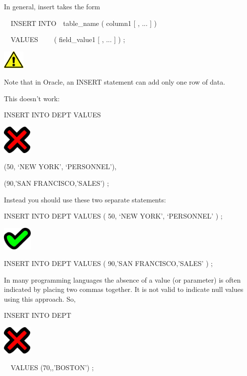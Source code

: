 In general, insert takes the form

\ \ INSERT INTO\ \ table\_name ( column1 [ , ... ] )

\ \ VALUES \ \ \ \ ( field\_value1 [ , ... ] ) ;



\begin{center}
  
\includegraphics[width=1.076cm,height=0.917cm]{images/img (2).png}

\end{center}
Note that in Oracle, an INSERT statement can add only one row of data. 

This doesn't work: 

INSERT INTO DEPT VALUES

\begin{center}
  
\includegraphics[width=1.443cm,height=1.427cm]{images/img (26).png}

\end{center}
(50, `NEW YORK', `PERSONNEL'),

(90,'SAN FRANCISCO,'SALES') ;

Instead you should use these two separate statements:

INSERT INTO DEPT VALUES ( 50, `NEW YORK', `PERSONNEL' ) ;

\begin{center}
  
\includegraphics[width=1.443cm,height=1.184cm]{images/img (27).png}

\end{center}
INSERT INTO DEPT VALUES ( 90,'SAN FRANCISCO,'SALES{}' ) ;

In many programming languages the absence of a value (or parameter) is often indicated by placing two commas together.  It is not valid to indicate null values using this approach.  So, 

INSERT INTO DEPT

\begin{center}
  
\includegraphics[width=1.443cm,height=1.427cm]{images/img (26).png}

\end{center}
\ \ VALUES (70,,'BOSTON') ;

